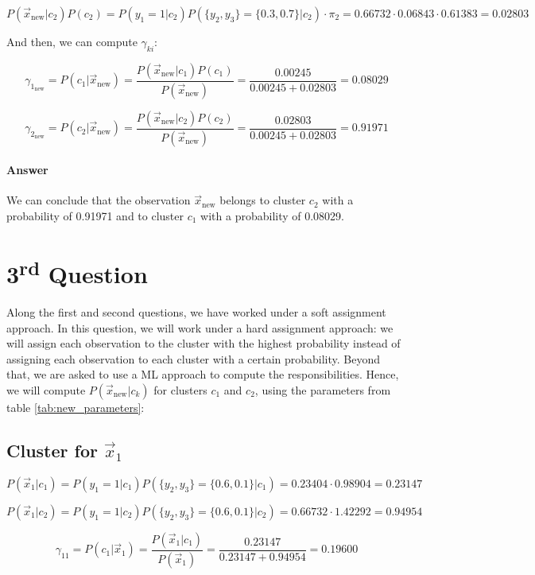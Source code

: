 \documentclass{article}
\begin{document}
\[ P(\vec{x}_{\text{new}} | c_2)P(c_2) = P(y_1 = 1 | c_2) P(\{y_2, y_3\}   = \{0.3, 0.7\} | c_2) \cdot \pi_2 = 0.66732 \cdot 0.06843 \cdot 0.61383 = 0.02803 \]

And then, we can compute $\gamma_{ki}$:

\[ \gamma_{1_{\text{new}}} = P(c_1| \vec{x}_{\text{new}}) = \frac{P(\vec{x}_{\text{new}} | c_1) P(c_1)}{P(\vec{x}_{\text{new}})} = \frac{0.00245}{0.00245 + 0.02803} = 0.08029 \]

\[ \gamma_{2_{\text{new}}} = P(c_2| \vec{x}_{\text{new}}) = \frac{P(\vec{x}_{\text{new}} | c_2) P(c_2)}{P(\vec{x}_{\text{new}})} = \frac{0.02803}{0.00245 + 0.02803} = 0.91971 \]

\paragraph{Answer} We can conclude that the observation $\vec{x}_{\text{new}}$ belongs to cluster $c_2$ with a probability of 0.91971 and to cluster $c_1$ with a probability of 0.08029.

\newpage

\section*{3\textsuperscript{rd} Question}

Along the first and second questions, we have worked under a soft assignment approach. In this question, we will work under a hard assignment approach: we will assign each observation to the cluster with the highest probability instead of assigning each observation to each cluster with a certain probability.
Beyond that, we are asked to use a ML approach to compute the responsibilities. Hence, we will compute $P(\vec{x}_{\text{new}} | c_k)$ for clusters $c_1$ and $c_2$, using the parameters from table \ref{tab:new_parameters}:

\subsection*{Cluster for $\vec{x}_1$}

\[ P(\vec{x}_1 | c_1) = P(y_1 = 1 | c_1) P(\{y_2, y_3\}  = \{0.6, 0.1\} | c_1) = 0.23404 \cdot 0.98904 = 0.23147 \]

\[ P(\vec{x}_1 | c_2) = P(y_1 = 1 | c_2) P(\{y_2, y_3\}  = \{0.6, 0.1\} | c_2) = 0.66732 \cdot 1.42292 = 0.94954 \]

\[ \gamma_{11} = P(c_1| \vec{x}_1) = \frac{P(\vec{x}_1 | c_1)}{P(\vec{x}_1)} = \frac{0.23147}{0.23147 + 0.94954} = 0.19600 \]
\end{document}
